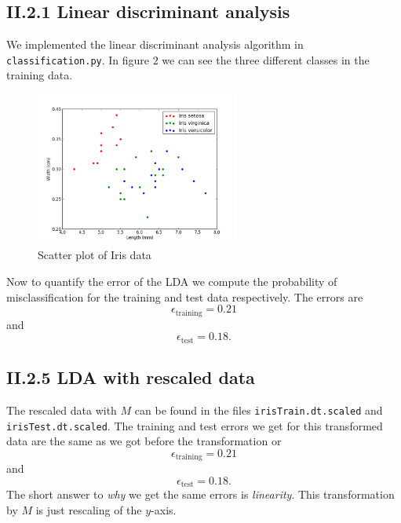 \documentclass[a4paper,10pt]{article}
\begin{document}
\subsection*{II.2.1 Linear discriminant analysis}

We implemented the linear discriminant analysis algorithm in \verb=classification.py=. In figure $2$ we can see the three different classes in the training data.
\begin{figure}[H]
	\centering
  		\centering
  		\includegraphics[width=0.6\textwidth]{../images/report/iris_scatter.png}
  		\caption{Scatter plot of Iris data}
\end{figure}
Now to quantify the error of the LDA we compute the probability of misclassification for the training and test data respectively. The errors are
$$\epsilon_{\text{training}} = 0.21$$
and
$$\epsilon_{\text{test}} = 0.18.$$

\subsection*{II.2.5 LDA with rescaled data}

The rescaled data with $M$ can be found in the files \verb=irisTrain.dt.scaled= and \verb=irisTest.dt.scaled=. The training and test errors we get for this transformed data are the same as we got before the transformation or 
$$\epsilon_{\text{training}} = 0.21$$
and
$$\epsilon_{\text{test}} = 0.18.$$
The short answer to \emph{why} we get the same errors is \emph{linearity}. This transformation by $M$ is just rescaling of the $y$-axis.

\end{document}
